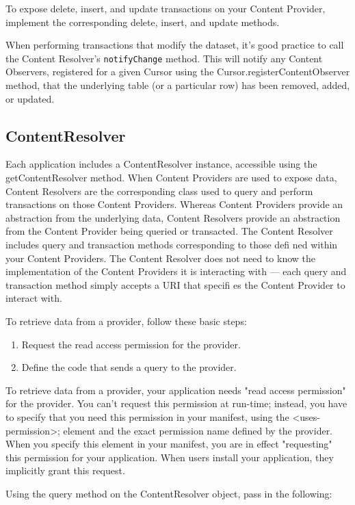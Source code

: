 To expose delete, insert, and update transactions on your Content Provider, implement the corresponding delete, insert, and update methods.

When performing transactions that modify the dataset, it’s good practice to call the Content Resolver’s \texttt{notifyChange} method. This will notify any Content Observers, registered for a given Cursor using the Cursor.registerContentObserver method, that the underlying table (or a particular row) has been removed, added, or updated.

\subsection{ContentResolver}
Each application includes a ContentResolver instance, accessible using the getContentResolver method. When Content Providers are used to expose data, Content Resolvers are the corresponding class used to query and perform transactions on those Content Providers. Whereas Content Providers provide an abstraction from the underlying data, Content Resolvers provide an abstraction from the Content Provider being queried or transacted. The Content Resolver includes query and transaction methods corresponding to those defi ned within your Content Providers. The Content Resolver does not need to know the implementation of the Content Providers it is interacting with — each query and transaction method simply accepts a URI that specifi es the Content Provider to interact with.

To retrieve data from a provider, follow these basic steps:

\begin{enumerate}
	\item Request the read access permission for the provider.
	\item Define the code that sends a query to the provider.
\end{enumerate}


To retrieve data from a provider, your application needs "read access permission" for the provider. You can't request this permission at run-time; instead, you have to specify that you need this permission in your manifest, using the <uses-permission>; element and the exact permission name defined by the provider. When you specify this element in your manifest, you are in effect "requesting" this permission for your application. When users install your application, they implicitly grant this request.

Using the query method on the ContentResolver object, pass in the following:

